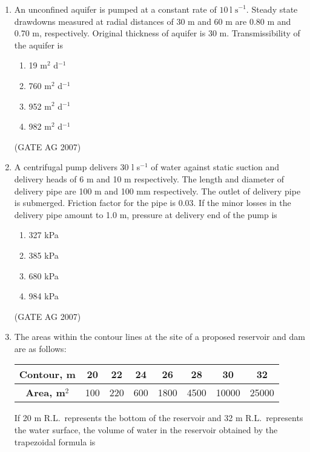 \documentclass[journal,12pt,onecolumn]{IEEEtran}
\theoremstyle{remark}
\begin{document}
\begin{enumerate}
\item An unconfined aquifer is pumped at a constant rate of $10 \ \text{l s}^{-1}$. Steady state drawdowns measured at radial distances of 30 m and 60 m are 0.80 m and 0.70 m, respectively. Original thickness of aquifer is 30 m. Transmissibility of the aquifer is
\begin{multicols}{4}
\begin{enumerate}
    \item 19 m$^2$ d$^{-1}$
    \item 760 m$^2$ d$^{-1}$
    \item 952 m$^2$ d$^{-1}$
    \item 982 m$^2$ d$^{-1}$
\end{enumerate}
\end{multicols}
\hfill(GATE AG 2007)

\item A centrifugal pump delivers 30 l s$^{-1}$ of water against static suction and delivery heads of 6 m and 10 m respectively. The length and diameter of delivery pipe are 100 m and 100 mm respectively. The outlet of delivery pipe is submerged. Friction factor for the pipe is 0.03. If the minor losses in the delivery pipe amount to 1.0 m, pressure at delivery end of the pump is
\begin{multicols}{4}
\begin{enumerate}
    \item 327 kPa
    \item 385 kPa
    \item 680 kPa
    \item 984 kPa
\end{enumerate}
\end{multicols}
\hfill(GATE AG 2007)

\item The areas within the contour lines at the site of a proposed reservoir and dam are as follows:

\begin{table}[H]
\centering
\begin{tabular}{|c|c|c|c|c|c|c|c|}
\hline
\textbf{Contour, m} & 20 & 22 & 24 & 26 & 28 & 30 & 32 \\
\hline
\textbf{Area, m$^2$} & 100 & 220 & 600 & 1800 & 4500 & 10000 & 25000 \\
\hline
\end{tabular}
\end{table}

If 20 m R.L.\ represents the bottom of the reservoir and 32 m R.L.\ represents the water surface, the volume of water in the reservoir obtained by the trapezoidal formula is
\begin{multicols}{4}


\end{multicols}
\end{enumerate}
\end{document}
